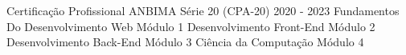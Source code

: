 \begin{cvhonors}
  \cvhonor
    {Certificação Profissional ANBIMA Série 20}
    {(CPA-20)}
    {2020 - 2023}
    {}
  \cvhonor
    {Fundamentos Do Desenvolvimento Web}
    {Módulo 1}
    {}
    {}
  \cvhonor
    {Desenvolvimento Front-End}
    {Módulo 2}
    {}
    {}
  \cvhonor
    {Desenvolvimento Back-End}
    {Módulo 3}
    {}
    {}
  \cvhonor
    {Ciência da Computação}
    {Módulo 4}
    {}
    {}
   
\end{cvhonors}

\vspace{.5cm}